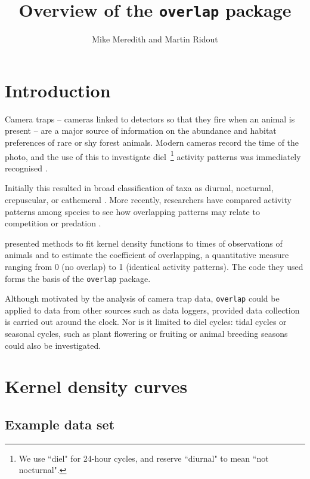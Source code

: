 \documentclass[a4paper]{article}
\title{Overview of the \texttt{overlap} package}
\author{Mike Meredith and Martin Ridout}
\begin{document}


\maketitle


\section{Introduction}
\label{sec:intro}

Camera traps -- cameras linked to detectors so that they fire when an animal is present -- are a major source of information on the abundance and habitat preferences of rare or shy forest animals. Modern cameras record the time of the photo, and the use of this to investigate diel~\footnote{We use ``diel" for 24-hour cycles, and reserve ``diurnal" to mean ``not nocturnal".} activity patterns was immediately recognised \citep{GriffithsVanSchaik1993}.

Initially this resulted in broad classification of taxa as diurnal, nocturnal, crepuscular, or cathemeral \citep{vanSchaikGriffiths1996}. More recently, researchers have compared activity patterns among species to see how overlapping patterns may relate to competition or predation \citep{LinkieRidout2011,Carver+2011,Ramesh+2012,Carter+2012,Kamler+2012,Ross+2013, Azevedo+2018}. %

\citet{RidoutLinkie2009} presented methods to fit kernel density functions to times of observations of animals and to estimate the coefficient of overlapping, a quantitative measure ranging from 0 (no overlap) to 1 (identical activity patterns). The code they used forms the basis of the \texttt{overlap} package.

Although motivated by the analysis of camera trap data, \texttt{overlap} could be applied to data from other sources such as data loggers, provided data collection is carried out around the clock. Nor is it limited to diel cycles: tidal cycles or seasonal cycles, such as plant flowering or fruiting or animal breeding seasons could also be investigated.


\section{Kernel density curves}
\label{sec:curve}

\subsection{Example data set}
\label{subsec:kerinci}
\end{document}
